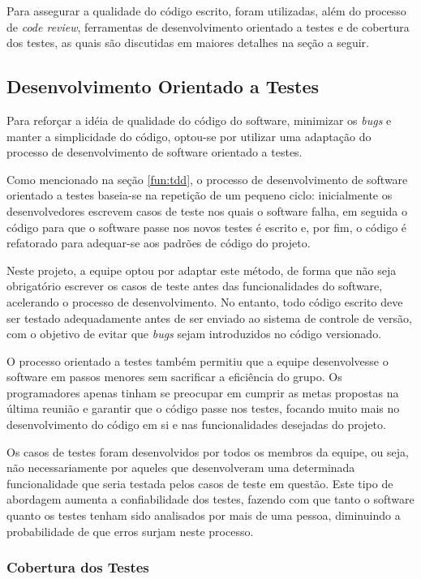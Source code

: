 Para assegurar a qualidade do código escrito, foram utilizadas, além do processo de \emph{code review}, ferramentas de desenvolvimento orientado a testes e de cobertura dos testes, as quais são discutidas em maiores detalhes na seção a seguir.

\subsection{Desenvolvimento Orientado a Testes}

Para reforçar a idéia de qualidade do código do software, minimizar os \emph{bugs} e manter a simplicidade do código, optou-se por utilizar uma adaptação do processo de desenvolvimento de software orientado a testes.

Como mencionado na seção \ref{fun:tdd}, o processo de desenvolvimento de software orientado a testes baseia-se na repetição de um pequeno ciclo: inicialmente os desenvolvedores escrevem casos de teste nos quais o software falha, em seguida o código para que o software passe nos novos testes é escrito e, por fim, o código é refatorado para adequar-se aos padrões de código do projeto.

Neste projeto, a equipe optou por adaptar este método, de forma que não seja obrigatório escrever os casos de teste antes das funcionalidades do software, acelerando o processo de desenvolvimento.
No entanto, todo código escrito deve ser testado adequadamente antes de ser enviado ao sistema de controle de versão, com o objetivo de evitar que \emph{bugs} sejam introduzidos no código versionado.

O processo orientado a testes também permitiu que a equipe desenvolvesse o software em passos menores sem sacrificar a eficiência do grupo.
Os programadores apenas tinham se preocupar em cumprir as metas propostas na última reunião e garantir que o código passe nos testes, focando muito mais no desenvolvimento do código em si e nas funcionalidades desejadas do projeto.

Os casos de testes foram desenvolvidos por todos os membros da equipe, ou seja, não necessariamente por aqueles que desenvolveram uma determinada funcionalidade que seria testada pelos casos de teste em questão.
Este tipo de abordagem aumenta a confiabilidade dos testes, fazendo com que tanto o software quanto os testes tenham sido analisados por mais de uma pessoa, diminuindo a probabilidade de que erros surjam neste processo.


\subsubsection{Cobertura dos Testes}

